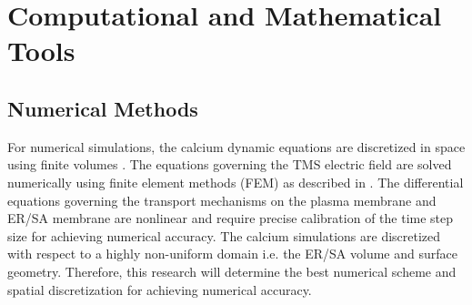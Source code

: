 \documentclass[12pt]{article}
\begin{document}

\section{Computational and Mathematical Tools}
\subsection*{Numerical Methods} For numerical simulations, the calcium dynamic equations are discretized in space using finite
volumes \cite{LeVeque2002}. The equations governing the TMS electric field are solved numerically using finite element methods (FEM) as described in \cite{book}. %
The differential equations governing the transport mechanisms on the plasma membrane and ER/SA membrane are nonlinear and require precise calibration of the time step size for achieving numerical accuracy. The calcium simulations are discretized with respect to a highly non-uniform domain i.e. the ER/SA volume and surface geometry. Therefore, this research will determine the best numerical scheme and spatial discretization for achieving numerical accuracy.
\end{document}

